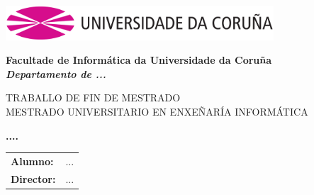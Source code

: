 %
%

%

\begin{titlepage}

	\begin{center}

		\includegraphics[width=10cm]{./Images/logoudc.png}
		\vspace{2cm}

		{\Large{\textbf{Facultade de Informática da Universidade da Coruña}}}
		\\
		{\it \large{\textbf{Departamento de ...}}}
		\vspace{1cm}

		{\large TRABALLO DE FIN DE MESTRADO\\ MESTRADO UNIVERSITARIO EN ENXEÑARÍA INFORMÁTICA}
		\vspace{1cm}

		\textbf{\Large ....}
		\vspace{7cm}
	\end{center}

	\begin{flushright}
		\begin{tabular}{ll}
			\large{\textbf{Alumno:}}	&
			\large{...} \\

			\large{\textbf{Director:}}	&
			\large{...} \\

		\end{tabular}
	\end{flushright}

\end{titlepage}
